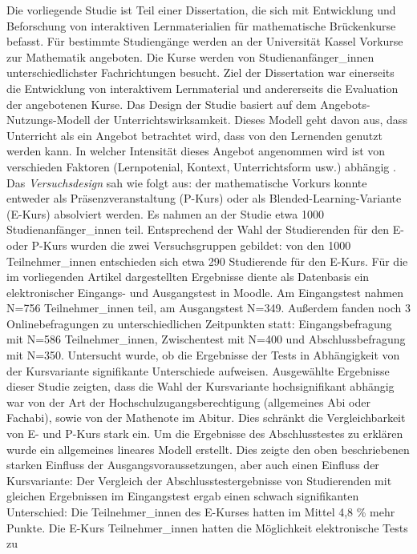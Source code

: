 \documentclass[12pt, bibliography=totoc]{scrartcl}
\begin{document}
Die vorliegende Studie ist Teil einer Dissertation, die sich mit
Entwicklung und Beforschung von interaktiven Lernmaterialien für
mathematische Brückenkurse befasst. Für bestimmte Studiengänge werden an
der Universität Kassel Vorkurse zur Mathematik angeboten. Die Kurse
werden von Studienanfänger\_innen unterschiedlichster Fachrichtungen
besucht. Ziel der Dissertation war einerseits die Entwicklung von
interaktivem Lernmaterial und andererseits die Evaluation der
angebotenen Kurse. Das Design der Studie basiert auf dem
Angebots-Nutzungs-Modell der Unterrichtswirksamkeit. Dieses Modell geht
davon aus, dass Unterricht als ein Angebot betrachtet wird, dass von den
Lernenden genutzt werden kann. In welcher Intensität dieses Angebot
angenommen wird ist von verschieden Faktoren (Lernpotenial, Kontext,
Unterrichtsform usw.) abhängig \parencite{Helmke2008}. Das
\emph{Versuchsdesign} sah wie folgt aus: der mathematische Vorkurs
konnte entweder als Präsenzveranstaltung (P-Kurs) oder als
Blended-Learning-Variante (E-Kurs) absolviert werden. Es nahmen an der
Studie etwa 1000 Studienanfänger\_innen teil. Entsprechend der Wahl der
Studierenden für den E- oder P-Kurs wurden die zwei Versuchsgruppen
gebildet: von den 1000 Teilnehmer\_innen entschieden sich etwa 290
Studierende für den E-Kurs. Für die im vorliegenden Artikel
dargestellten Ergebnisse diente als Datenbasis ein elektronischer
Eingangs- und Ausgangstest in Moodle. Am Eingangstest nahmen N=756
Teilnehmer\_innen teil, am Ausgangstest N=349. Außerdem fanden noch 3
Onlinebefragungen zu unterschiedlichen Zeitpunkten statt:
Eingangsbefragung mit N=586 Teilnehmer\_innen, Zwischentest mit N=400
und Abschlussbefragung mit N=350. Untersucht wurde, ob die Ergebnisse
der Tests in Abhängigkeit von der Kursvariante signifikante Unterschiede
aufweisen. Ausgewählte Ergebnisse dieser Studie zeigten, dass die Wahl
der Kursvariante hochsignifikant abhängig war von der Art der
Hochschulzugangsberechtigung (allgemeines Abi oder Fachabi), sowie von
der Mathenote im Abitur. Dies schränkt die Vergleichbarkeit von E- und
P-Kurs stark ein. Um die Ergebnisse des Abschlusstestes zu erklären
wurde ein allgemeines lineares Modell erstellt. Dies zeigte den oben
beschriebenen starken Einfluss der Ausgangsvoraussetzungen, aber auch
einen Einfluss der Kursvariante: Der Vergleich der
Abschlusstestergebnisse von Studierenden mit gleichen Ergebnissen im
Eingangstest ergab einen schwach signifikanten Unterschied: Die
Teilnehmer\_innen des E-Kurses hatten im Mittel 4,8 \% mehr Punkte. Die
E-Kurs Teilnehmer\_innen hatten die Möglichkeit elektronische Tests zu
\end{document}
